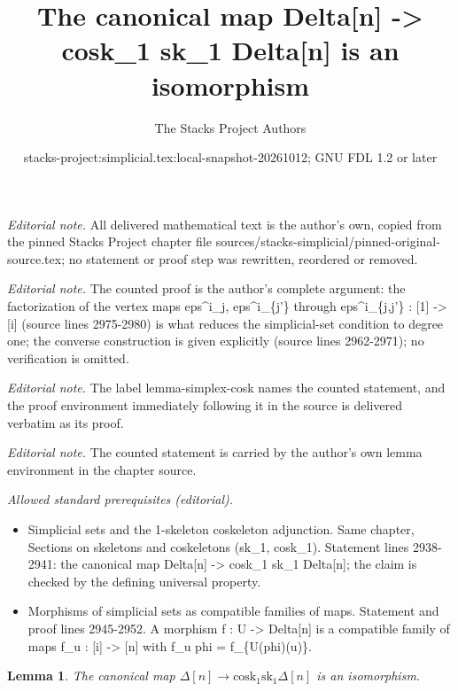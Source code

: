 \documentclass{stacks-project}
\title{The canonical map Delta[n] -> cosk\_1 sk\_1 Delta[n] is an isomorphism}
\author{The Stacks Project Authors}
\date{stacks-project:simplicial.tex:local-snapshot-20261012; GNU FDL 1.2 or later}
\theoremstyle{plain}
\newtheorem{lemma}[subsection]{Lemma}
\theoremstyle{definition}
\theoremstyle{remark}
\numberwithin{equation}{subsection}
\begin{document}
\maketitle
\noindent\textit{Editorial note.} All delivered mathematical text is the author's own, copied from the pinned Stacks Project chapter file sources/stacks-simplicial/pinned-original-source.tex; no statement or proof step was rewritten, reordered or removed.\par\medskip
\noindent\textit{Editorial note.} The counted proof is the author's complete argument: the factorization of the vertex maps eps\textasciicircum{}i\_j, eps\textasciicircum{}i\_\{j'\} through eps\textasciicircum{}i\_\{j,j'\} : [1] -> [i] (source lines 2975-2980) is what reduces the simplicial-set condition to degree one; the converse construction is given explicitly (source lines 2962-2971); no verification is omitted.\par\medskip
\noindent\textit{Editorial note.} The label lemma-simplex-cosk names the counted statement, and the proof environment immediately following it in the source is delivered verbatim as its proof.\par\medskip
\noindent\textit{Editorial note.} The counted statement is carried by the author's own lemma environment in the chapter source.\par\medskip
\noindent\textit{Allowed standard prerequisites (editorial).}\begin{itemize}
\item Simplicial sets and the 1-skeleton coskeleton adjunction. Same chapter, Sections on skeletons and coskeletons (sk\_1, cosk\_1). Statement lines 2938-2941: the canonical map Delta[n] -> cosk\_1 sk\_1 Delta[n]; the claim is checked by the defining universal property.
\item Morphisms of simplicial sets as compatible families of maps. Statement and proof lines 2945-2952. A morphism f : U -> Delta[n] is a compatible family of maps f\_u : [i] -> [n] with f\_u phi = f\_\{U(phi)(u)\}.
\end{itemize}\medskip
\begin{lemma}
\label{lemma-simplex-cosk}
The canonical map
$\Delta[n] \to \text{cosk}_1 \text{sk}_1 \Delta[n]$
is an isomorphism.
\end{lemma}
\end{document}
